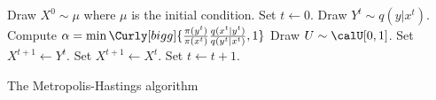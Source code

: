 \begin{algorithm}
\begin{algorithmic}
  \tophrule
  \STATE Draw $X^0\sim\mu$ where $\mu$ is the initial condition.
  \STATE Set $t\leftarrow0$.
  \REPEAT
    \STATE Draw $Y^t\sim q(y|x^t)$.
    \STATE Compute $\alpha = \min\Curly[bigg]{
      \frac{\pi(y^t)}{\pi(x^t)}\frac{q(x^t|y^t)}{q(y^t|x^t)}, 1}$
    \STATE Draw $U\sim\calU[0,1]$.
      \STATE Set $X^{t+1}\leftarrow Y^t$.
    \ELSE
      \STATE Set $X^{t+1}\leftarrow X^t$.
    \ENDIF
    \STATE Set $t\leftarrow t+1$.
  \bottomhrule
\end{algorithmic}
\caption{The Metropolis-Hastings algorithm}
\label{alg:mh}
\end{algorithm}
